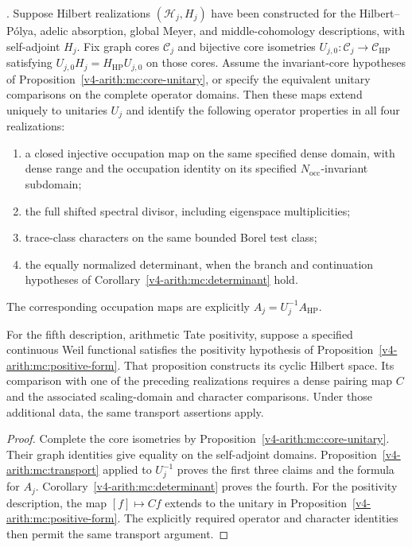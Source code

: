 \begin{theorem}
\label{v4-arith:w9-r4:thm:unified-residual}
\ClaimStatusProvedHereConditional. Suppose Hilbert realizations
$(\mathcal H_j,H_j)$ have been constructed for the Hilbert--P\'olya,
adelic absorption, global Meyer, and middle-cohomology descriptions,
with self-adjoint $H_j$.
Fix graph cores $\mathcal C_j$ and bijective core isometries
$U_{j,0}:\mathcal C_j\to\mathcal C_{\mathrm{HP}}$ satisfying
$U_{j,0}H_j=H_{\mathrm{HP}}U_{j,0}$ on those cores.
Assume the invariant-core hypotheses of
Proposition~\ref{v4-arith:mc:core-unitary}, or specify the equivalent
unitary comparisons on the complete operator domains.
Then these maps extend uniquely to unitaries $U_j$ and identify
the following operator properties in all four realizations:
\begin{enumerate}
\item a closed injective occupation map on the same specified dense
domain, with dense range and the occupation identity on its
specified $N_{\mathrm{occ}}$-invariant subdomain;
\item the full shifted spectral divisor, including eigenspace
multiplicities;
\item trace-class characters on the same bounded Borel test class;
\item the equally normalized determinant, when the branch and
continuation hypotheses of Corollary~\ref{v4-arith:mc:determinant} hold.
\end{enumerate}
The corresponding occupation maps are explicitly
$A_j=U_j^{-1}A_{\mathrm{HP}}$.

For the fifth description, arithmetic Tate positivity, suppose a
specified continuous Weil functional satisfies the positivity
hypothesis of Proposition~\ref{v4-arith:mc:positive-form}.
That proposition constructs its cyclic Hilbert space. Its comparison
with one of the preceding realizations requires a dense pairing map
$C$ and the associated scaling-domain and character comparisons.
Under those additional data, the same transport assertions apply.
\end{theorem}
\begin{proof}
Complete the core isometries by Proposition~\ref{v4-arith:mc:core-unitary}.
Their graph identities give equality on the self-adjoint domains.
Proposition~\ref{v4-arith:mc:transport} applied to $U_j^{-1}$ proves
the first three claims and the formula for $A_j$.
Corollary~\ref{v4-arith:mc:determinant} proves the fourth.
For the positivity description, the map $[f]\mapsto Cf$ extends
to the unitary in Proposition~\ref{v4-arith:mc:positive-form}.
The explicitly required operator and character identities then
permit the same transport argument.
\end{proof}

